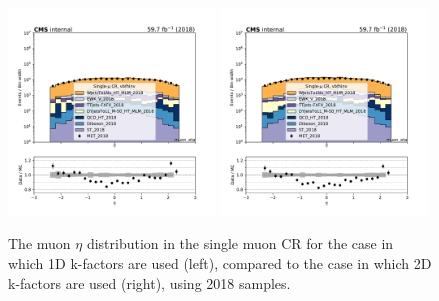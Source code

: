 \begin{figure}
    \begin{center}
        \includegraphics[width=0.49\textwidth]{fig/datamc_1dkfac/cr_1m_vbf/cr_1m_vbf_muon_eta_losf_2018.pdf}
        \includegraphics[width=0.49\textwidth]{fig/datamc/cr_1m_vbf/cr_1m_vbf_muon_eta_losf_2018.pdf} 
        \caption{The muon $\eta$ distribution in the single muon CR for the case in which 1D k-factors are used (left), 
        compared to the case in which 2D k-factors are used (right), using 2018 samples.}
        \label{fig:muon_eta_2018}
    \end{center}
\end{figure}
